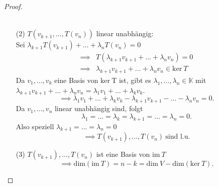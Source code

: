 \begin{proof}
\begin{enumerate}
\begin{align*}
        \end{align*}
        \item[(2)] $T(v_{k+1},\dots,T(v_n))$ linear unabhängig:\\
        Sei $\lambda_{k+1}T(v_{k+1}) + \dots + \lambda_n T(v_n) = 0$
        \begin{align*}
            \implies &T(\lambda_{k+1}v_{k+1}+\dots +\lambda_nv_n) = 0\\
            \implies &\lambda_{k+1}v_{k+1} + \dots + \lambda_n v_n \in \mathrm{ker}\ T
        \end{align*}
        Da $v_1,\dots,v_k$ eine Basis von $\mathrm{ker}\ $T ist, gibt es 
        $\lambda_1,\dots,\lambda_n\in \mathbb{K}$ mit\\
        $\lambda_{k+1}v_{k+1} + \dots + \lambda_nv_n = \lambda_1 v_1 + \dots + \lambda_k v_k$.
        \[
            \implies \lambda_1v_1 + \dots + \lambda_kv_k - \lambda_{k+1}v_{k+1} - \dots - \lambda_n v_n = 0    
        .\]
        Da $v_1,\dots,v_n$ linear unabhängig sind, folgt
        \[
            \lambda_1 = \dots = \lambda_k = \lambda_{k+1} = \dots = \lambda_n = 0   
        .\]
        Also speziell $\lambda_{k+1} = \dots = \lambda_n = 0$
        \[
            \implies T(v_{k+1}),\dots,T(v_n)\ \text{sind l.u.}
        \]
        \item[(3)] $T(v_{k+1}),\dots,T(v_n)$ ist eine Basis von $\mathrm{im}\ T$
        \[
            \implies \mathrm{dim}(\mathrm{im}\ T) = n-k = \mathrm{dim}\ V - \mathrm{dim}(\mathrm{ker}\ T)    
        .\]
    \end{enumerate} 
\end{proof}